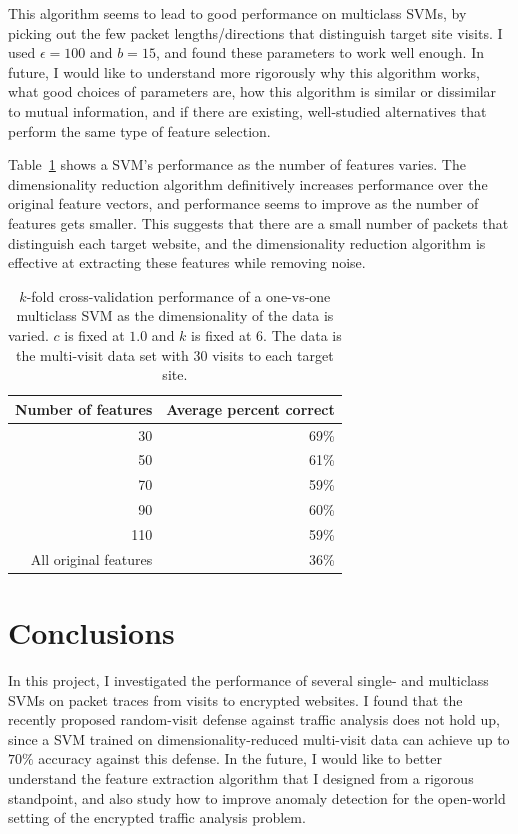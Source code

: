 \documentclass[10pt, twocolumn]{article}
\begin{document}
This algorithm seems to lead to good performance on multiclass SVMs, by picking out the few packet lengths/directions that 
distinguish target site visits. I used $\epsilon=100$ and $b=15$, and found these parameters to work well enough.
 In future, I would like to understand more rigorously why this algorithm works, what good choices of parameters are, how 
 this algorithm is similar or dissimilar to mutual information,
  and if there are
existing, well-studied alternatives that perform the same type of feature selection.

Table~\ref{tab:dimred-kfold} shows a SVM's performance as the number of features varies. The dimensionality 
reduction algorithm definitively increases performance over the original feature vectors, and performance 
seems to improve as the number of features gets smaller. This suggests that there are a small number of 
packets that distinguish each target website, and the dimensionality reduction algorithm is effective at 
extracting these features while removing noise.

\begin{table}
\caption{$k$-fold cross-validation performance of a one-vs-one multiclass SVM as the dimensionality of 
the data is varied. $c$ is fixed at $1.0$ and $k$ is fixed at $6$. The data is the multi-visit data set 
with 30 visits to each target site.}
\begin{center}
\begin{tabular}{|r|r|}
\hline
Number of features & Average percent correct \\
\hline
30 & 69\% \\
\hline
50 & 61\% \\
\hline
70 & 59\% \\
\hline
90 & 60\% \\
\hline
110 & 59\% \\
\hline
All original features & 36\% \\ \hline
\end{tabular}
\end{center}
\label{tab:dimred-kfold}
\end{table}%

\section{Conclusions}

In this project, I investigated the performance of several single- and multiclass SVMs on packet traces from visits to encrypted websites. 
I found that the recently proposed random-visit defense against traffic analysis does not hold up, since a SVM trained on 
dimensionality-reduced multi-visit data can achieve up to $70\%$ accuracy against this defense. In the future, I would like to better 
understand the feature extraction algorithm that I designed from a rigorous standpoint, and also study how to improve anomaly detection 
for the open-world setting of the encrypted traffic analysis problem.




\end{document}
